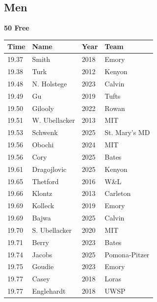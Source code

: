 \subsection{Men}
\vspace{1.2em}
\noindent\begin{minipage}[t]{0.98\textwidth}
\centering
\textbf{\textcolor{teamprimary}{50 Free}}\par
\vspace{0.5em}
\centering
\small
\renewcommand{\arraystretch}{1.0}
\setlength{\tabcolsep}{4pt}
\begin{tabular}{@{}p{2.5cm}p{4.5cm}p{1.5cm}p{2.5cm}@{}}
\toprule
\textbf{Time} & \textbf{Name} & \textbf{Year} & \textbf{Team} \\
\midrule
19.37 & Smith & 2018 & Emory \\
19.38 & Turk & 2012 & Kenyon \\
19.48 & N. Holstege & 2023 & Calvin \\
19.49 & Gu & 2019 & Tufts \\
19.50 & Gilooly & 2022 & Rowan \\
19.51 & W. Ubellacker & 2013 & MIT \\
19.53 & Schwenk & 2025 & St. Mary's MD \\
19.56 & Obochi & 2024 & MIT \\
19.56 & Cory & 2025 & Bates \\
19.61 & Dragojlovic & 2025 & Kenyon \\
19.65 & Thetford & 2016 & W\&L \\
19.66 & Klontz & 2013 & Carleton \\
19.69 & Kolleck & 2019 & Emory \\
19.69 & Bajwa & 2025 & Calvin \\
19.70 & S. Ubellacker & 2020 & MIT \\
19.71 & Berry & 2023 & Bates \\
19.74 & Jacobs & 2025 & Pomona-Pitzer \\
19.75 & Goudie & 2023 & Emory \\
19.77 & Casey & 2018 & Loras \\
19.77 & Englehardt & 2018 & UWSP \\
\bottomrule
\end{tabular}
\end{minipage}
\vspace{1.2em}

